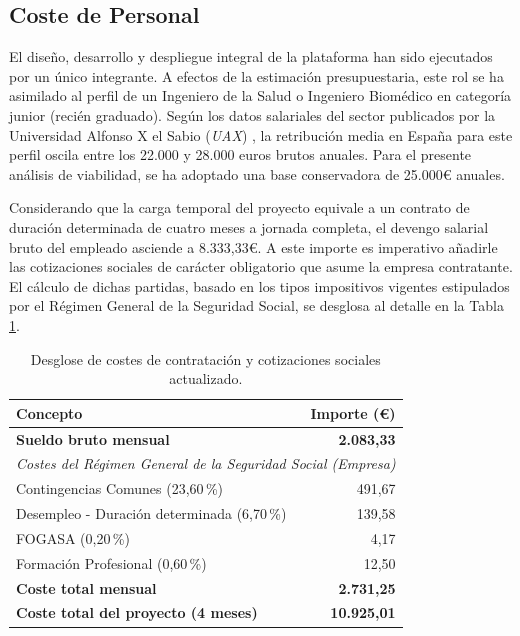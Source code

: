 \subsection{Coste de Personal}
El diseño, desarrollo y despliegue integral de la plataforma han sido ejecutados por un único integrante. A efectos de la estimación presupuestaria, este rol se ha asimilado al perfil de un Ingeniero de la Salud o Ingeniero Biomédico en categoría junior (recién graduado). Según los datos salariales del sector publicados por la Universidad Alfonso X el Sabio (\textit{UAX}) \cite{sueldo}, la retribución media en España para este perfil oscila entre los 22.000 y 28.000 euros brutos anuales. Para el presente análisis de viabilidad, se ha adoptado una base conservadora de 25.000€ anuales.

Considerando que la carga temporal del proyecto equivale a un contrato de duración determinada de cuatro meses a jornada completa, el devengo salarial bruto del empleado asciende a 8.333,33€. A este importe es imperativo añadirle las cotizaciones sociales de carácter obligatorio que asume la empresa contratante. El cálculo de dichas partidas, basado en los tipos impositivos vigentes estipulados por el Régimen General de la Seguridad Social, se desglosa al detalle en la Tabla \ref{tab:costes_contratacion}.

\begin{table}[hbt!]
\centering
\begin{tabular}{lr}
\hline
\textbf{Concepto} & \textbf{Importe (€)} \\ \hline
\textbf{Sueldo bruto mensual} & \textbf{2.083,33} \\ 
\multicolumn{2}{l}{\textit{Costes del Régimen General de la Seguridad Social (Empresa)}} \\
Contingencias Comunes (23,60\,\%) & 491,67 \\
Desempleo - Duración determinada (6,70\,\%) & 139,58 \\
FOGASA (0,20\,\%) & 4,17 \\
Formación Profesional (0,60\,\%) & 12,50 \\ \hline
\textbf{Coste total mensual} & \textbf{2.731,25} \\ \hline
\textbf{Coste total del proyecto (4 meses)} & \textbf{10.925,01} \\ \hline
\end{tabular}
\caption{Desglose de costes de contratación y cotizaciones sociales actualizado.}
\label{tab:costes_contratacion}
\end{table}

